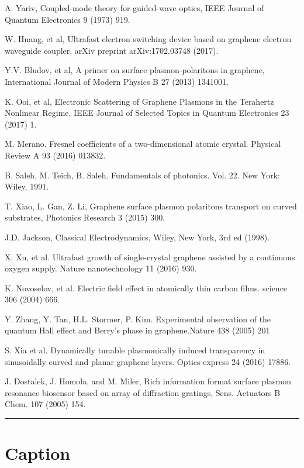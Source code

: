 \documentclass[preprint,12pt,numbers,sort&compress]{elsarticle}
\begin{document}
\begin{thebibliography}{99}
 A. Yariv, Coupled-mode theory for guided-wave optics, IEEE Journal of Quantum Electronics 9 (1973) 919.

 W. Huang, et al, Ultrafast electron switching device based on graphene electron waveguide coupler, arXiv preprint arXiv:1702.03748 (2017).

 Y.V. Bludov, et al, A primer on surface plasmon-polaritons in graphene, International Journal of Modern Physics B 27 (2013) 1341001.

 K. Ooi, et al, Electronic Scattering of Graphene Plasmons in the Terahertz Nonlinear Regime, IEEE Journal of Selected Topics in Quantum Electronics 23 (2017) 1.

 M. Merano. Fresnel coefficients of a two-dimensional atomic crystal. Physical Review A 93 (2016) 013832.

 B. Saleh, M. Teich, B. Saleh. Fundamentals of photonics. Vol. 22. New York: Wiley, 1991.

 T. Xiao, L. Gan, Z. Li, Graphene surface plasmon polaritons transport on curved substrates, Photonics Research 3 (2015) 300.

 J.D. Jackson, Classical Electrodynamics, Wiley, New York, 3rd ed (1998).

 X. Xu, et al. Ultrafast growth of single-crystal graphene assisted by a continuous oxygen supply. Nature nanotechnology 11 (2016) 930.

 K. Novoselov, et al. Electric field effect in atomically thin carbon films. science 306 (2004) 666.

 Y. Zhang, Y. Tan, H.L. Stormer, P. Kim. Experimental observation of the quantum Hall effect and Berry’s phase in graphene.Nature 438 (2005) 201

 S. Xia et al. Dynamically tunable plasmonically induced transparency in sinusoidally curved and planar graphene layers. Optics express 24 (2016) 17886.

 J. Dostalek, J. Homola, and M. Miler, Rich information format surface plasmon resonance biosensor based on array of diffraction gratings, Sens. Actuators B Chem. 107  (2005) 154. 

\end{thebibliography}

\newpage
\hrule
\section*{Caption}
\end{document}
